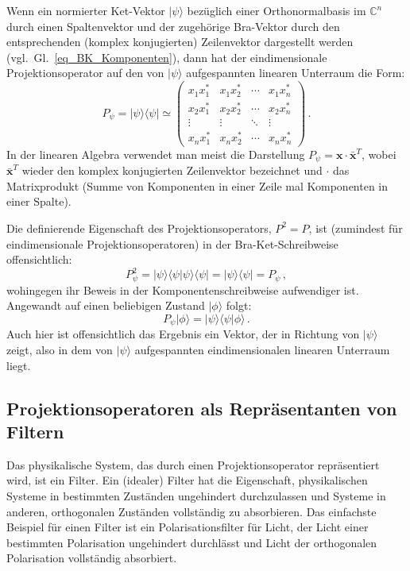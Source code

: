Wenn ein normierter 
Ket-Vektor $|\psi\rangle$ bez\"uglich einer Orthonormalbasis im $\mathbb{C}^n$ durch einen
Spaltenvektor und der zugeh\"orige Bra-Vektor durch den entsprechenden (komplex konjugierten)
Zeilenvektor dargestellt werden (vgl.\ Gl.\ \ref{eq_BK_Komponenten}), dann hat der eindimensionale
Projektionsoperator auf den von $|\psi\rangle$ aufgespannten linearen Unterraum die Form:
\begin{equation}
     P_\psi = | \psi \rangle \langle \psi | \simeq \left( \begin{array}{cccc}
      x_1 x_1^*  & x_1 x_2^* & \cdots & x_1 x_n^* \\
      x_2 x_1^* & x_2 x_2^* & \cdots & x_2 x_n^*  \\
      \vdots & \vdots & \ddots & \vdots  \\
      x_n x_1^* & x_n x_2^* & \cdots & x_n x_n^*  \end{array} \right)  \, .
\end{equation}
In der linearen Algebra verwendet man meist die Darstellung $P_\psi = \pmb{x}\cdot \pmb{\bar{x}}^T$, wobei
$\pmb{\bar{x}}^T$ wieder den komplex konjugierten Zeilenvektor bezeichnet und $\cdot$ das
Matrixprodukt (\glqq Summe von Komponenten in einer Zeile mal Komponenten in einer Spalte\grqq).

Die definierende Eigenschaft des Projektionsoperators, $P^2=P$, ist (zumindest f\"ur eindimensionale 
Projektionsoperatoren) in der Bra-Ket-Schreibweise offensichtlich:
\begin{equation}
                  P^2_\psi = | \psi \rangle \langle \psi | \psi \rangle \langle \psi | = | \psi \rangle \langle \psi |  = P_\psi \, ,
\end{equation}
wohingegen ihr Beweis in der Komponentenschreibweise aufwendiger ist.
Angewandt auf einen beliebigen Zustand $|\phi\rangle$ folgt:
\begin{equation}
                 P_\psi |\phi \rangle =| \psi \rangle \langle \psi | \phi \rangle \, . 
\end{equation}
Auch hier ist offensichtlich das Ergebnis ein Vektor, der in Richtung von $|\psi\rangle$ zeigt,
also in dem von $|\psi \rangle$ aufgespannten eindimensionalen linearen Unterraum liegt. 

\subsection{Projektionsoperatoren als Repr\"asentanten von Filtern}

Das physikalische System, das durch einen Projektionsoperator repr\"asentiert wird, ist ein
Filter. 
Ein (idealer) Filter hat die Eigenschaft, physikalischen Systeme in bestimmten Zust\"anden ungehindert 
durchzulassen und Systeme in anderen, orthogonalen Zust\"anden vollst\"andig zu absorbieren. Das
einfachste Beispiel f\"ur einen Filter ist ein Polarisationsfilter f\"ur Licht, der Licht einer bestimmten
Polarisation ungehindert durchl\"asst und Licht der orthogonalen Polarisation vollst\"andig absorbiert. 

